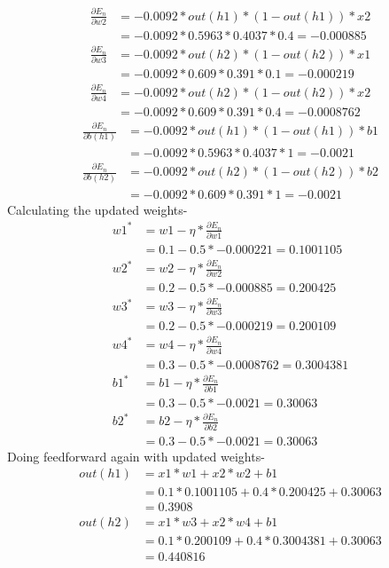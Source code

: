 \documentclass[12pt]{article}
\begin{document}
\begin{align*}
    \frac{\partial E_n}{\partial w2}
    &=-0.0092*out(h1)*(1-out(h1)) * x2\\
    &=-0.0092*0.5963*0.4037*0.4=-0.000885
\end{align*}
\begin{align*}
    \frac{\partial E_n}{\partial w3}
    &=-0.0092*out(h2)*(1-out(h2)) * x1\\
    &=-0.0092*0.609*0.391*0.1=-0.000219
\end{align*}
\begin{align*}
    \frac{\partial E_n}{\partial w4}
    &=-0.0092*out(h2)*(1-out(h2)) * x2\\
    &=-0.0092*0.609*0.391*0.4=-0.0008762
\end{align*}
\begin{align*}
    \frac{\partial E_n}{\partial b(h1)}
    &=-0.0092*out(h1)*(1-out(h1)) * b1\\
    &=-0.0092*0.5963*0.4037*1=-0.0021
\end{align*}
\begin{align*}
    \frac{\partial E_n}{\partial b(h2)}
    &=-0.0092*out(h2)*(1-out(h2)) * b2\\
    &=-0.0092*0.609*0.391*1=-0.0021
\end{align*}
Calculating the updated weights-
\begin{align*}
    w1^{*}
    &=w1-\eta * \frac{\partial E_n}{\partial w1}\\
    &=0.1-0.5*-0.000221=0.1001105\\
    w2^{*}
    &=w2-\eta * \frac{\partial E_n}{\partial w2}\\
    &=0.2-0.5*-0.000885=0.200425\\
    w3^{*}
    &=w3-\eta * \frac{\partial E_n}{\partial w3}\\
    &=0.2-0.5*-0.000219=0.200109\\
    w4^{*}
    &=w4-\eta * \frac{\partial E_n}{\partial w4}\\
    &=0.3-0.5*-0.0008762=0.3004381\\
    b1^{*}
    &=b1-\eta * \frac{\partial E_n}{\partial b1}\\
    &=0.3-0.5*-0.0021=0.30063\\
    b2^{*}
    &=b2-\eta * \frac{\partial E_n}{\partial b2}\\
    &=0.3-0.5*-0.0021=0.30063
\end{align*}
Doing feedforward again with updated weights-
\begin{align*}
    out(h1)
    &=x1 * w1 + x2 * w2 +b1\\
    &=0.1 * 0.1001105 + 0.4*0.200425 + 0.30063\\
    &=0.3908\\
    out(h2)
    &= x1 * w3 + x2 * w4 +b1 \\
    &=0.1*0.200109 + 0.4*0.3004381 + 0.30063\\
    &=0.440816
\end{align*}
\end{document}
